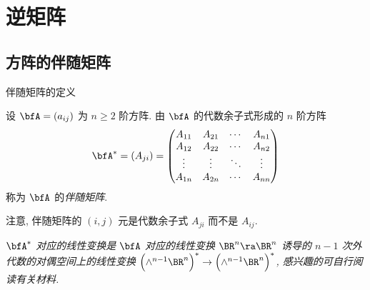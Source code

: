 \section{逆矩阵}

\subsection{方阵的伴随矩阵}

\begin{frame}{伴随矩阵的定义}
	\onslide<+->
	\begin{definition}
		设 $\bfA=(a_{ij})$ 为 $n\ge2$ 阶方阵.
		由 $\bfA$ 的代数余子式形成的 $n$ 阶方阵
		\[\bfA^*=(A_{ji})=\begin{pmatrix}
			A_{11}&A_{21}&\cdots&A_{n1}\\
			A_{12}&A_{22}&\cdots&A_{n2}\\
			\vdots&\vdots&\ddots&\vdots\\
			A_{1n}&A_{2n}&\cdots&A_{nn}
		\end{pmatrix}\]
		称为 $\bfA$ 的\emph{伴随矩阵}.
	\end{definition}
	\onslide<+->
	注意, 伴随矩阵的 $(i,j)$ 元是代数余子式 \alert{$A_{ji}$ 而不是 $A_{ij}$}.

	\onslide<+->
	{\itshape $\bfA^*$ 对应的线性变换是 $\bfA$ 对应的线性变换 $\BR^n\ra\BR^n$ 诱导的 $n-1$ 次外代数的对偶空间上的线性变换 $\Bigl(\wedge^{n-1}\BR^n\Bigr)^*\to\Bigl(\wedge^{n-1}\BR^n\Bigr)^*$, 感兴趣的可自行阅读有关材料.}
\end{frame}


